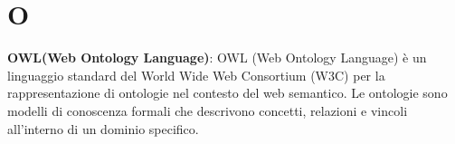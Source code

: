\section{O}
\textbf{OWL(Web Ontology Language)}: OWL (Web Ontology Language) è un linguaggio standard del World Wide Web Consortium (W3C) per la rappresentazione di ontologie nel contesto del web semantico. Le ontologie sono modelli di conoscenza formali che descrivono concetti, relazioni e vincoli all'interno di un dominio specifico.